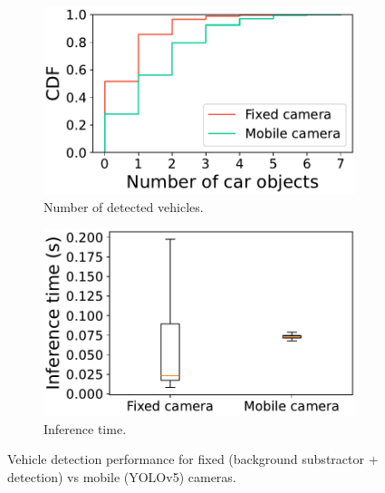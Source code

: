 \begin{figure}
    \centering
    \begin{subfigure}[t]{0.47\linewidth}
        \centering
        \includegraphics[width=\linewidth]{chapters/videojam/images/fixed_and_mobile_camera_output_filtered.pdf}
        \caption{Number of detected vehicles.}
    \end{subfigure}
    \hfill
    \begin{subfigure}[t]{0.47\linewidth}
        \centering
        \includegraphics[width=\linewidth]{chapters/videojam/images/inference_times.pdf}
        \caption{Inference time.}
    \end{subfigure}
    \caption{Vehicle detection performance for fixed (background substractor + detection) vs mobile (YOLOv5) cameras.}
    \label{fig:mobile_v_fixed}
\end{figure}

